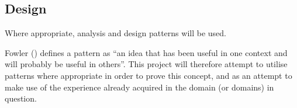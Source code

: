 \subsection{Design}
Where appropriate, analysis and design patterns will be used.

Fowler (\citeyear[][Section~1.3]{fowler1997analysis}) defines a
pattern as ``an idea that has been useful in one context and will probably be
useful in others''. This project will therefore attempt to utilise patterns
where appropriate in order to prove this concept, and as an attempt to make use
of the experience already acquired in the domain (or domains) in question.
